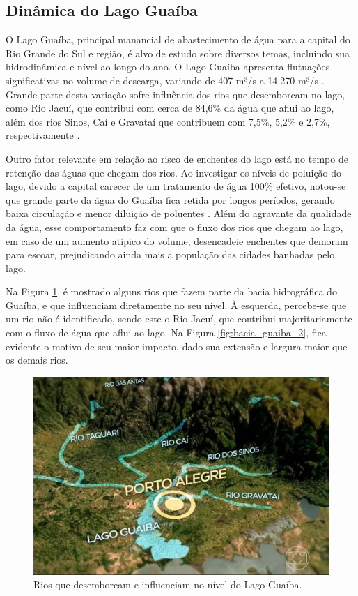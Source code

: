 \subsection{Dinâmica do Lago Guaíba}

O Lago Guaíba, principal manancial de abastecimento de água para a capital do Rio Grande do Sul e região, é alvo de estudo sobre diversos temas, incluindo sua hidrodinâmica e nível ao longo do ano. O Lago Guaíba apresenta flutuações significativas no volume de descarga, variando de 407 m³/s a 14.270 m³/s \cite{andrade2017}. Grande parte desta variação sofre influência dos rios que desemborcam no lago, como Rio Jacuí, que contribui com cerca de 84,6\% da água que aflui ao lago, além dos rios Sinos, Caí e Gravataí que contribuem com 7,5\%, 5,2\% e 2,7\%, respectivamente \cite{andrade2019}. 

Outro fator relevante em relação ao risco de enchentes do lago está no tempo de retenção das águas que chegam dos rios. Ao investigar os níveis de poluição do lago, devido a capital carecer de um tratamento de água 100\% efetivo, notou-se que grande parte da água do Guaíba fica retida por longos períodos, gerando baixa circulação e menor diluição de poluentes \cite{andrade2019}. Além do agravante da qualidade da água, esse comportamento faz com que o fluxo dos rios que chegam ao lago, em caso de um aumento atípico do volume, desencadeie enchentes que demoram para escoar, prejudicando ainda mais a população das cidades banhadas pelo lago. 

Na Figura \ref{fig:bacia_guaiba}, é mostrado alguns rios que fazem parte da bacia hidrográfica do Guaíba, e que influenciam diretamente no seu nível. À esquerda, percebe-se que um rio não é identificado, sendo este o Rio Jacuí, que contribui majoritariamente com o fluxo de água que aflui ao lago. Na Figura \ref{fig:bacia_guaiba_2}, fica evidente o motivo de seu maior impacto, dado sua extensão e largura maior que os demais rios. 

\begin{figure}[H]
	\caption{\label{fig:bacia_guaiba}Rios que desemborcam e influenciam no nível do Lago Guaíba.}
	\begin{center}
		\includegraphics[scale=0.4]{figuras/lago_guaiba.jpg}
	\end{center}
\end{figure}

